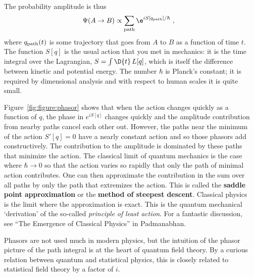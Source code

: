 The probability amplitude is thus
\begin{align}
    \Psi(A\to B) \propto \sum_\textnormal{path}
    \e^{iS[q_\textnormal{path}]/\hbar} \ ,
\end{align}
where $q_\textnormal{path}(t)$ is some trajectory that goes from $A$ to $B$ as a function of time $t$. The function $S[q]$ is the usual action that you met in mechanics: it is the time integral over the Lagrangian, $S=\int\D{t}\, L[q]$, which is itself the difference between kinetic and potential energy. The number $\hbar$ is Planck's constant; it is required by dimensional analysis and with respect to human scales it is quite small.

Figure~\ref{fig:figure:phasor} shows that when the action changes quickly as a function of $q$, the phase in $e^{iS[q]}$ changes quickly and the amplitude contribution from nearby paths cancel each other out. However, the paths near the minimum of the action $S'[q]=0$ have a nearly constant action and so those phasors add constructively. The contribution to the amplitude is dominated by these paths that minimize the action. The classical limit of quantum mechanics is the case where $\hbar \to 0$ so that the action varies so rapidly that only the path of minimal action contributes. One can then approximate the contribution in the sum over all paths by only the path that extremizes the action. This is called the \textbf{saddle point approximation} or the \textbf{method of steepest descent}. Classical physics is the limit where the approximation is exact. This is the quantum mechanical `derivation' of the so-called \emph{principle of least action}. For a fantastic discussion, see ``The Emergence of Classical Physics'' in Padmanabhan\autocite{Padmanabhan:2015boa}.

Phasors are not used much in modern physics, but the intuition of the phasor picture of the path integral is at the heart of quantum field theory. By a curious relation between quantum and statistical physics, this is closely related to statistical field theory by a factor of $i$.



